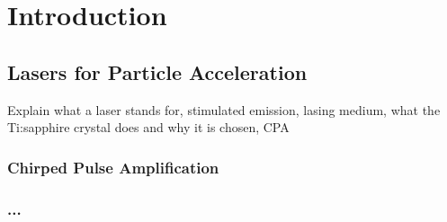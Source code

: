 \chapter{Introduction}

\section{Lasers for Particle Acceleration}

Explain what a laser stands for, stimulated emission, lasing medium, what the Ti:sapphire crystal does and why it is chosen, CPA

\subsection{Chirped Pulse Amplification}

\subsection{...}

%


